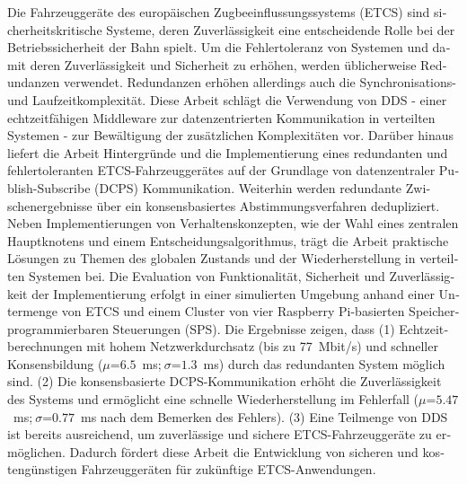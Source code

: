 \null\vfil
\begin{otherlanguage}{ngerman}
\begin{center}\textsf{\textbf{\abstractname}}\end{center}

\noindent 
Die Fahrzeuggeräte des europäischen Zugbeeinflussungssystems (ETCS) sind sicherheitskritische Systeme, deren Zuverlässigkeit eine entscheidende Rolle bei der Betriebssicherheit der Bahn spielt.
Um die Fehlertoleranz von Systemen und damit deren Zuverlässigkeit und Sicherheit zu erhöhen, werden üblicherweise Redundanzen verwendet.
Redundanzen erhöhen allerdings auch die Synchronisations- und Laufzeitkomplexität.
Diese Arbeit schlägt die Verwendung von DDS - einer echtzeitfähigen Middleware zur datenzentrierten Kommunikation in verteilten Systemen - zur Bewältigung der zusätzlichen Komplexitäten vor.
Darüber hinaus liefert die Arbeit Hintergründe und die Implementierung eines redundanten und fehlertoleranten ETCS-Fahrzeuggerätes auf der Grundlage von datenzentraler Publish-Subscribe (DCPS) Kommunikation.
Weiterhin werden redundante Zwischenergebnisse über ein konsensbasiertes Abstimmungsverfahren dedupliziert.
Neben Implementierungen von Verhaltenskonzepten, wie der Wahl eines zentralen Hauptknotens und einem Entscheidungsalgorithmus, trägt die Arbeit praktische Lösungen zu Themen des globalen Zustands und der Wiederherstellung in verteilten Systemen bei.
Die Evaluation von Funktionalität, Sicherheit und Zuverlässigkeit der Implementierung erfolgt in einer simulierten Umgebung anhand einer Untermenge von ETCS und einem Cluster von vier Raspberry Pi-basierten Speicherprogrammierbaren Steuerungen (SPS).
Die Ergebnisse zeigen, dass (1) Echtzeitberechnungen mit hohem Netzwerkdurchsatz (bis zu 77~Mbit/s) und schneller Konsensbildung ($\mu$=$6.5$~ms;$~\sigma$=$1.3$~ms) durch das redundanten System möglich sind.
(2) Die konsensbasierte DCPS-Kommunikation erhöht die Zuverlässigkeit des Systems und ermöglicht eine schnelle Wiederherstellung im Fehlerfall ($\mu$=$5.47$~ms;$~\sigma$=$0.77$~ms nach dem Bemerken des Fehlers).
(3) Eine Teilmenge von DDS ist bereits ausreichend, um zuverlässige und sichere ETCS-Fahrzeuggeräte zu ermöglichen.
Dadurch fördert diese Arbeit die Entwicklung von sicheren und kostengünstigen Fahrzeuggeräten für zukünftige ETCS-Anwendungen.

\end{otherlanguage}
\vfil\null



